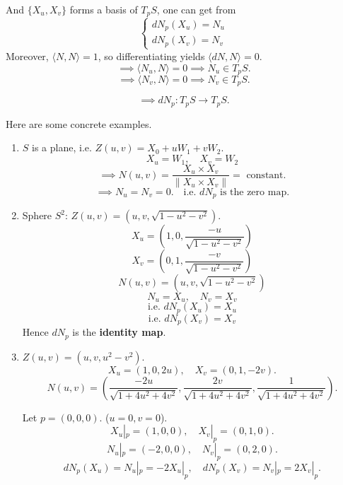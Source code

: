 \documentclass{article}
\begin{document}

And $\{X_u, X_v\}$ forms a basis of $T_p S$, one can get from
$$\begin{cases} d N_p (X_u) = N_u \\ d N_p (X_v) = N_v \end{cases}$$
Moreover, $\langle N, N \rangle = 1$, so differentiating yields $\langle d N, N \rangle = 0$.
$$\implies \langle N_u, N \rangle = 0 \implies N_u \in T_p S.$$
$$\implies \langle N_v, N \rangle = 0 \implies N_v \in T_p S.$$

$$\implies d N_p: T_p S \to T_p S.$$

\begin{example}
    Here are some concrete examples.
    \begin{enumerate}
        \item $S$ is a plane, i.e. $Z(u, v) = X_0 + u W_1 + v W_2$.
        $$X_u = W_1, \quad X_v = W_2$$
        $$\implies N(u, v) = \frac{X_u \times X_v}{\|X_u \times X_v\|} = \text{ constant.}$$
        $$\implies N_u = N_v = 0. \quad \text{i.e. } d N_p \text{ is the zero map.}$$

        \item Sphere $S^2$: $Z(u, v) = (u, v, \sqrt{1-u^2-v^2})$.
        $$X_u = \left(1, 0, \frac{-u}{\sqrt{1-u^2-v^2}}\right)$$
        $$X_v = \left(0, 1, \frac{-v}{\sqrt{1-u^2-v^2}}\right)$$
        $$N(u, v) = (u, v, \sqrt{1-u^2-v^2})$$
        $$N_u = X_u, \quad N_v = X_v$$
        $$\text{i.e. } d N_p (X_u) = X_u$$
        $$\text{i.e. } d N_p (X_v) = X_v$$
        Hence $d N_p$ is the \textbf{identity map}.
    \item $Z(u, v) = (u, v, u^2 - v^2)$.
    $$X_u = (1, 0, 2u), \quad X_v = (0, 1, -2v).$$
    $$N(u, v) = \left( \frac{-2u}{\sqrt{1 + 4u^2 + 4v^2}}, \frac{2v}{\sqrt{1 + 4u^2 + 4v^2}}, \frac{1}{\sqrt{1 + 4u^2 + 4v^2}} \right).$$

    Let $p = (0, 0, 0)$. ($u=0, v=0$).
    $$X_u|_p = (1, 0, 0), \quad X_v|_p = (0, 1, 0).$$
    $$N_u|_p = (-2, 0, 0), \quad N_v|_p = (0, 2, 0).$$
    $$d N_p (X_u) = N_u|_p = -2 X_u|_p, \quad d N_p (X_v) = N_v|_p = 2 X_v|_p.$$
    \end{enumerate}
\end{example}
\end{document}
